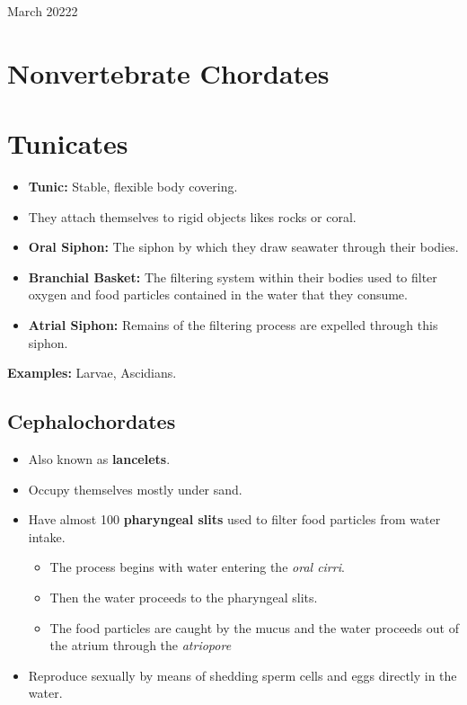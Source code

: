 \documentclass[12pt,oneside]{book} %
\begin{document}
\begin{lec}{March 20222}
  \section{Nonvertebrate Chordates}
  
  \section*{Tunicates}
  \begin{itemize}
    \item \textbf{Tunic:} Stable, flexible body covering.
    \item They attach themselves to rigid objects likes rocks or coral.
    \item \textbf{Oral Siphon:} The siphon by which they draw seawater through their bodies.
    \item \textbf{Branchial Basket:} The filtering system within their bodies used to filter oxygen and food particles
    contained in the water that they consume.
    \item \textbf{Atrial Siphon:} Remains of the filtering process are expelled through this siphon.
  \end{itemize}

  \textbf{Examples:} Larvae, Ascidians.

  \subsection*{Cephalochordates}

  \begin{itemize}
    \item Also known as \textbf{lancelets}.
    \item Occupy themselves mostly under sand.
    \item Have almost 100 \textbf{pharyngeal slits} used to filter food particles from water intake.
    \begin{itemize}
      \item The process begins with water entering the \textit{oral cirri}.
      \item Then the water proceeds to the pharyngeal slits.
      \item The food particles are caught by the mucus and the water proceeds out of the atrium through the \textit{atriopore}
    \end{itemize}
    \item Reproduce sexually by means of shedding sperm cells and eggs directly in the water. 


\end{itemize}
\end{lec}
\end{document}
